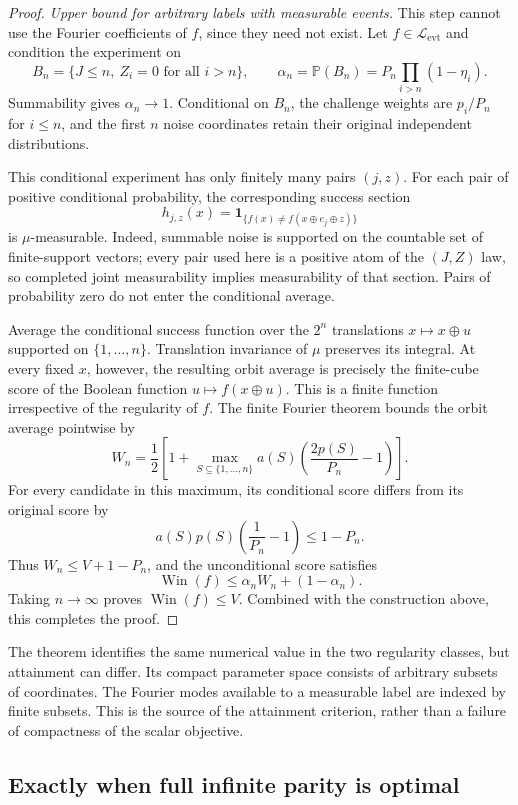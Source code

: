 \documentclass[11pt,a4paper]{article}
\theoremstyle{definition}
\theoremstyle{remark}
\newcommand{\Pbb}{\mathbb P}
\newcommand{\Win}{\operatorname{Win}}
\begin{document}
\begin{proof}
\emph{Upper bound for arbitrary labels with measurable events.}
This step cannot use the Fourier coefficients of $f$, since they need
not exist.  Let $f\in\mathcal L_{\mathrm{evt}}$ and condition the experiment on
\[
 B_n=\{J\le n,\ Z_i=0\text{ for all }i>n\},
 \qquad
 \alpha_n=\Pbb(B_n)=P_n\prod_{i>n}(1-\eta_i).
\]
Summability gives $\alpha_n\to1$.  Conditional on $B_n$, the challenge
weights are $p_i/P_n$ for $i\le n$, and the first $n$ noise coordinates
retain their original independent distributions.

This conditional experiment has only finitely many pairs $(j,z)$.
For each pair of positive conditional probability, the corresponding
success section
\[
 h_{j,z}(x)=\mathbf1_{\{f(x)\ne f(x\oplus e_j\oplus z)\}}
\]
is $\mu$-measurable.  Indeed, summable noise is supported on the
countable set of finite-support vectors; every pair used here is a
positive atom of the $(J,Z)$ law, so completed joint measurability
implies measurability of that section.  Pairs of probability zero do
not enter the conditional average.

Average the conditional success function over the $2^n$ translations
$x\mapsto x\oplus u$ supported on $\{1,\ldots,n\}$.  Translation
invariance of $\mu$ preserves its integral.  At every fixed $x$, however,
the resulting orbit average is precisely the finite-cube score of the
Boolean function $u\mapsto f(x\oplus u)$.  This is a finite function
irrespective of the regularity of $f$.  The finite Fourier theorem
bounds the orbit average pointwise by
\[
 W_n=\frac12\left[1+
 \max_{S\subseteq\{1,\ldots,n\}}
 a(S)\left(\frac{2p(S)}{P_n}-1\right)\right].
\]
For every candidate in this maximum, its conditional score differs
from its original score by
\[
 a(S)p(S)\left(\frac1{P_n}-1\right)\le 1-P_n.
\]
Thus $W_n\le V+1-P_n$, and the unconditional score satisfies
\[
 \Win(f)\le\alpha_n W_n+(1-\alpha_n).
\]
Taking $n\to\infty$ proves $\Win(f)\le V$.  Combined with the
construction above, this completes the proof.
\end{proof}

The theorem identifies the same numerical value in the two regularity
classes, but attainment can differ.  Its compact parameter space consists
of arbitrary subsets of coordinates.  The Fourier modes available to a
measurable label are indexed by finite subsets.  This is the source of the
attainment criterion, rather than a failure of compactness of the scalar
objective.

\subsection{Exactly when full infinite parity is optimal}
\end{document}
